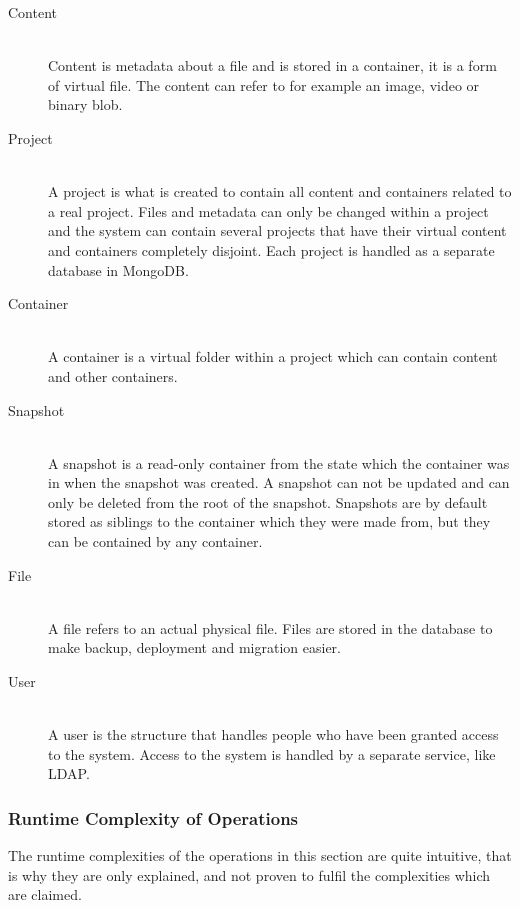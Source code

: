 \documentclass[a4paper,12pt]{article}
\begin{document}
\begin{description}
\item[Content] \hfill \\
Content is metadata about a file and is stored in a container, it is a form of virtual file.  The
content can refer to for example an image, video or binary blob.\\

\item[Project] \hfill \\
A project is what is created to contain all content and containers related to a real project. Files
and metadata can only be changed within a project and the system can contain several projects 
that have their virtual content and containers completely disjoint. Each project is handled as a
separate database in MongoDB.\\

\item[Container] \hfill \\
A container is a virtual folder within a project which can contain content and other containers.\\

\item[Snapshot] \hfill \\
A snapshot is a read-only container from the state which the container was in when the snapshot
was created.  A snapshot can not be updated and can only be deleted from the root of the snapshot.
Snapshots are by default stored as siblings to the container which they were made from, but they can
be contained by any container.\\

\item[File] \hfill \\
A file refers to an actual physical file. Files are stored in the database to make backup,
deployment and migration easier.\\

\item[User] \hfill \\
A user is the structure that handles people who have been granted access to the system. Access to
the system is handled by a separate service, like LDAP.\\

\end{description}
\subsubsection{Runtime Complexity of Operations} \label{sec:run_time}
The runtime complexities of the operations in this section are quite intuitive, that is why they 
are only explained, and not proven to fulfil the complexities which are claimed. 
\end{document}

